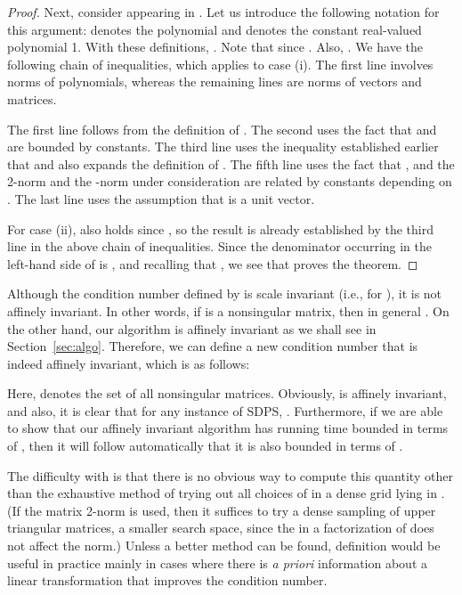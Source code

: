 \documentclass{article}
\newcommand\eref[1]{}
\begin{document}
\begin{proof}
Next, consider  appearing in
\eref{eq:hatfminusf2}.  
Let us introduce the following notation for this
argument:  denotes the polynomial  and
 denotes the constant real-valued polynomial 1. 
With these definitions, .
Note that  since .
Also, .
We have the following chain of inequalities,
which applies to case (i).
 The first line involves
norms of polynomials, whereas the remaining lines are norms of vectors
and matrices.  

The first line follows from the definition of . The second uses the
fact that  and 
are bounded by constants.  The third line uses the inequality established
earlier that  and also
expands the definition of .  The fifth line uses the fact that
, and the 2-norm and the -norm under
consideration
are related by constants  depending on .  
The last line uses the assumption that 
is a unit vector.

For case (ii), \eref{eq:hatfminusf_numer} also holds since , so
the result is already established by the third line in the above chain
of inequalities.
Since the denominator occurring in the left-hand side of
\eref{eq:hatfminusf2} is ,
and
recalling that , we see that
\eref{eq:hatfminusf_numer} proves the theorem.
\end{proof}

Although the condition number defined by \eref{cond_def} is scale invariant
(i.e.,  for ), it is not
affinely invariant.
In other words, if  is a nonsingular  matrix, then
in general .  On the other hand, our algorithm
is affinely invariant as we shall see in Section~\ref{sec:algo}.  Therefore,
we can define a new condition number that is indeed affinely invariant,
which is as follows:

Here,  denotes the set of all  nonsingular
matrices.
Obviously, \eref{eq:invarcond} is affinely invariant, and also,
it is clear that for any instance  of SDPS, .
Furthermore, if we are able to show that our affinely invariant algorithm
has running time bounded in terms of , then it will follow
automatically that it is also bounded in terms of .

The difficulty with \eref{eq:invarcond} is that there is no obvious
way to compute this quantity other than the exhaustive
method of trying out all choices of 
in a dense grid lying in .  (If the matrix 2-norm is
used, then it suffices to try a dense sampling of upper triangular matrices,
a smaller search space,
since the  in a  factorization of  does not affect the norm.)
Unless a better method
can be found,  
definition \eref{eq:invarcond}
would be useful in practice
mainly in cases where there is {\em a priori} information
about a linear transformation that improves the condition number.
\end{document}
